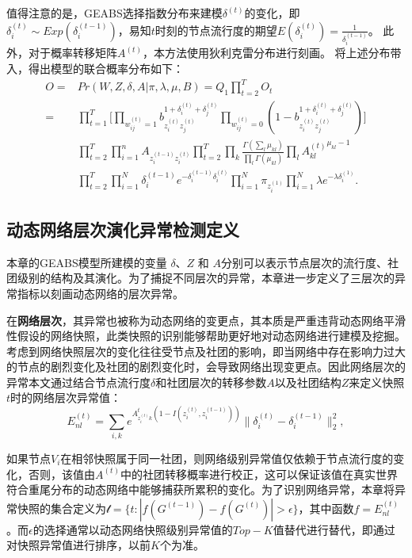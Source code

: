 值得注意的是，GEABS选择指数分布来建模$\delta^{(t)}$的变化，即 $\delta_i^{(t)} \sim Exp(\delta_i^{(t-1)})$，易知$t$时刻的节点流行度的期望$E(\delta_i^{(t)}) = \frac{1}{\delta_i^{(t-1)}}$。
此外，对于概率转移矩阵$A^{(t)}$，本方法使用狄利克雷分布进行刻画。
将上述分布带入，得出模型的联合概率分布如下：
\begin{align}
O = & Pr(W, Z,\delta, A|\pi, \lambda, \mu, B) = Q_1 \prod_{t=2}^{T} O_t \nonumber \\
=  & \prod_{t=1}^{T} \Big[\prod_{w_{ij}^{(t)}=1} b_{z_i^{(t)} z_j^{(t)}}^{1+\delta_i^{(t)}+\delta_j^{(t)}}  \prod_{w_{ij}^{(t)}=0} (1-b_{z_i^{(t)} z_j^{(t)}}^{1+\delta_i^{(t)}+\delta_j^{(t)}})\Big]  \nonumber  \\
& \prod_{t=2}^{T} \prod_{i=1}^{n} A_{z_i^{(t-1)} z_i^{(t)}}  \prod_{t=2}^{T} \prod_{k} \frac{\Gamma (\sum_l \mu_{kl})}{\prod_l \Gamma (\mu_{kl})} \prod_l {A^{(t)}_{kl}}^{\mu_{kl} - 1} \nonumber\\
 &\prod_{t=2}^{T} \prod_{i=1}^{N} \delta_i^{(t-1)} e^{-\delta_i^{(t-1)} \delta_i^{(t)}} \prod_{i=1}^{N} \pi_{z_i^{(1)}}  \prod_{i=1}^{N} \lambda e^{-\lambda \delta_i^{(1)}}. 
\label{eq:O8}
\end{align}

\subsection{动态网络层次演化异常检测定义}
本章的GEABS模型所建模的变量 $\delta$、$Z$ 和 $A$分别可以表示节点层次的流行度、社团级别的结构及其演化。为了捕捉不同层次的异常，本章进一步定义了三层次的异常指标以刻画动态网络的层次异常。

在\textbf{网络层次}，其异常也被称为动态网络的变更点，其本质是严重违背动态网络平滑性假设的网络快照，此类快照的识别能够帮助更好地对动态网络进行建模及挖掘。考虑到网络快照层次的变化往往受节点及社团的影响，即当网络中存在影响力过大的节点的剧烈变化及社团的剧烈变化时，会导致网络出现变更点。因此网络层次的异常本文通过结合节点流行度$\delta$和社团层次的转移参数$A$以及社团结构$Z$来定义快照$t$时的网络层次异常值：
\begin{equation}
    E_{nl}^{(t)} = \sum_{i, k} e^{A_{z_i^{(t)} k}^t  (1-I(z_i^{(t)},z_i^{(t-1)}))} \| \delta_i^{(t)} - \delta_i^{(t-1)} \|_2^2,
\label{eq:O9}
\end{equation}

如果节点$V_i$在相邻快照属于同一社团，则网络级别异常值仅依赖于节点流行度的变化，否则，该值由$A^{(t)}$中的社团转移概率进行校正，这可以保证该值在真实世界符合重尾分布的动态网络中能够捕获所累积的变化。为了识别网络异常，本章将异常快照的集合定义为$\mathcal{t} = \{t : |f(G^{(t-1)}) -f(G^{(t)})| > \epsilon  \}$，其中函数$f = E_{nl}^{(t)}$。而$\epsilon$的选择通常以动态网络快照级别异常值的$Top-K$值替代进行替代，即通过对快照异常值进行排序，以前$K$个为准。

